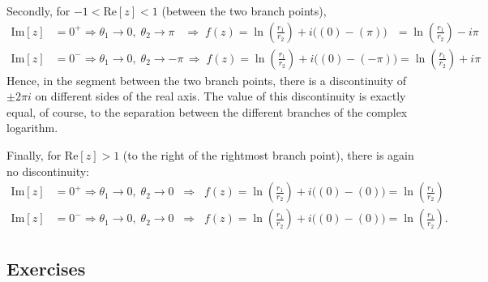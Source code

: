 \documentclass[10pt,a4paper]{article}
\begin{document}
Secondly, for $-1 < \mathrm{Re}[z] < 1$ (between the two branch
points),
\begin{align}
  \mathrm{Im}[z] &= 0^+ \Rightarrow \theta_1 \rightarrow 0, \; \theta_2 \rightarrow \pi \;\;\;\Rightarrow\; f(z) = \ln\!\left(\frac{r_1}{r_2}\right) + i\big((0) - (\pi)\big) \;\;\,= \ln\left(\frac{r_1}{r_2}\right) -i\pi \\
  \mathrm{Im}[z] &= 0^- \Rightarrow \theta_1 \rightarrow 0, \; \theta_2 \rightarrow -\pi \,\Rightarrow\; f(z) = \ln\!\left(\frac{r_1}{r_2}\right) + i\big((0) - (-\pi)\big) = \ln\left(\frac{r_1}{r_2}\right) + i\pi
\end{align}
Hence, in the segment between the two branch points, there is a
discontinuity of $\pm 2\pi i$ on different sides of the real axis.
The value of this discontinuity is exactly equal, of course, to the
separation between the different branches of the complex logarithm.

Finally, for $\mathrm{Re}[z] > 1$ (to the right of the rightmost
branch point), there is again no discontinuity:
\begin{align}
  \mathrm{Im}[z] &= 0^+ \Rightarrow \theta_1 \rightarrow 0, \; \theta_2 \rightarrow 0 \;\;\Rightarrow\;\; f(z) = \ln\!\left(\frac{r_1}{r_2}\right) + i\big((0) - (0)\big) = \ln\left(\frac{r_1}{r_2}\right) \\
  \mathrm{Im}[z] &= 0^- \Rightarrow \theta_1 \rightarrow 0, \; \theta_2 \rightarrow 0 \;\;\Rightarrow\;\; f(z) = \ln\!\left(\frac{r_1}{r_2}\right) + i\big((0) - (0)\big) = \ln\left(\frac{r_1}{r_2}\right).
\end{align}

\vskip 0.5in

\subsection{Exercises}\label{exercises}
\end{document}
